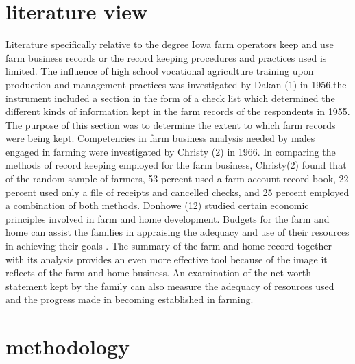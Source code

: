 \documentclass[12pt,]{article}
\begin{document}
\section{literature view}
Literature specifically relative to the degree Iowa farm operators 
keep and use farm business records or the record keeping procedures and practices used is limited.
The influence of high school vocational agriculture training upon 
production and management practices was investigated by Dakan (1) in 1956.the instrument included a section in the form of a check list which determined the different kinds of information kept in the farm records of the respondents in 1955. The purpose of this section was to determine the extent to which farm records were being kept.
Competencies in farm business analysis needed by males engaged in 
farming were investigated by Christy (2) in 1966. In comparing the methods of record keeping employed for the farm business, Christy(2) found that of the random sample of farmers, 53 percent used a farm account record book, 22 percent used only a file of receipts and cancelled checks, and 25 percent employed a combination of both methods. 
Donhowe (12) studied certain economic principles involved in farm and home development.  Budgets for the farm and home can assist the families in appraising the adequacy and use of their resources in achieving their goals . The summary of the farm and home record together with its analysis provides an even more effective tool because of the image it reflects of the farm and home business. An examination of the net worth statement kept by the family can also measure the adequacy of resources used and the progress made in becoming established in farming. 
\section{methodology}
\end{document}

